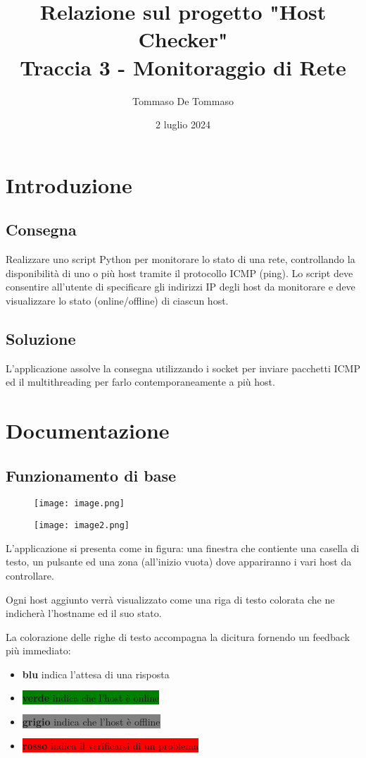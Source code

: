 \documentclass[a4paper]{report}
\title{Relazione sul progetto "Host Checker" \\ Traccia 3 - Monitoraggio di Rete}
\author{Tommaso De Tommaso}
\date{2 luglio 2024}
\begin{document}
\maketitle

\chapter{Introduzione}

\section{Consegna}
Realizzare uno script Python per monitorare lo stato di una rete, controllando la disponibilità di uno o più host tramite il protocollo ICMP (ping). Lo script deve consentire all'utente di specificare gli indirizzi IP degli host da monitorare e deve visualizzare lo stato (online/offline) di ciascun host.

\section{Soluzione}
L'applicazione assolve la consegna utilizzando i socket per inviare pacchetti ICMP ed il multithreading per farlo contemporaneamente a più host.

\chapter{Documentazione}
\section{Funzionamento di base}
\begin{figure}[h!]
\begin{minipage}{.5\textwidth}
    \centering
    \texttt{[image: image.png]}
\end{minipage}
\begin{minipage}{.5\textwidth}
    \centering
    \texttt{[image: image2.png]}
\end{minipage}
\end{figure}
L'applicazione si presenta come in figura: una finestra che contiente una casella di testo, un pulsante ed una zona (all'inizio vuota) dove appariranno i vari host da controllare.

Ogni host aggiunto verrà visualizzato come una riga di testo colorata che ne indicherà l'hostname ed il suo stato.

La colorazione delle righe di testo accompagna la dicitura fornendo un feedback più immediato: 
\begin{itemize}
    \item \colorbox{TealBlue}{\textbf{blu} indica l'attesa di una risposta}
    \item \colorbox{Green}{\textbf{verde} indica che l'host è online}
    \item \colorbox{Gray}{\textbf{grigio} indica che l'host è offline}
    \item \colorbox{Red}{\textbf{rosso} indica il verificarsi di un problema}
\end{itemize}
\end{document}
